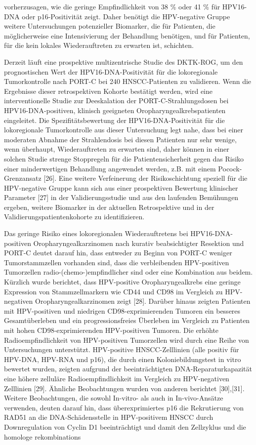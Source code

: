 vorherzusagen, wie die geringe Empfindlichkeit von 38 \% oder 41 \% für HPV16-DNA oder p16-Positivität zeigt. Daher benötigt die HPV-negative Gruppe weitere Untersuchungen potenzieller Biomarker, die für Patienten, die möglicherweise eine Intensivierung der Behandlung benötigen, und für Patienten, für die kein lokales Wiederauftreten zu erwarten ist, schichten.

Derzeit läuft eine prospektive multizentrische Studie des DKTK-ROG, um den prognostischen Wert der HPV16-DNA-Positivität für die lokoregionale Tumorkontrolle nach PORT-C bei 240 HNSCC-Patienten zu validieren. Wenn die Ergebnisse dieser retrospektiven Kohorte bestätigt werden, wird eine interventionelle Studie zur Deeskalation der PORT-C-Strahlungsdosen bei HPV16-DNA-positiven, klinisch geeigneten Oropharyngealkrebspatienten eingeleitet. Die Spezifitätsbewertung der HPV16-DNA-Positivität für die lokoregionale Tumorkontrolle aus dieser Untersuchung legt nahe, dass bei einer moderaten Abnahme der Strahlendosis bei diesen Patienten nur sehr wenige, wenn überhaupt, Wiederauftreten zu erwarten sind, daher können in einer solchen Studie strenge Stoppregeln für die Patientensicherheit gegen das Risiko einer minderwertigen Behandlung angewendet werden, z.B. mit einem Pocock-Grenzansatz {[}26{]}. Eine weitere Verfeinerung der Risikoschichtung speziell für die HPV-negative Gruppe kann sich aus einer prospektiven Bewertung klinischer Parameter {[}27{]} in der Validierungsstudie und aus den laufenden Bemühungen ergeben, weitere Biomarker in der aktuellen Retrospektive und in der Validierungspatientenkohorte zu identifizieren.

Das geringe Risiko eines lokoregionalen Wiederauftretens bei HPV16-DNA-positiven Oropharyngealkarzinomen nach kurativ beabsichtigter Resektion und PORT-C deutet darauf hin, dass entweder zu Beginn von PORT-C weniger Tumorstammzellen vorhanden sind, dass die verbleibenden HPV-positiven Tumorzellen radio-(chemo-)empfindlicher sind oder eine Kombination aus beidem. Kürzlich wurde berichtet, dass HPV-positive Oropharyngealkrebs eine geringe Expression von Stammzellmarkern wie CD44 und CD98 im Vergleich zu HPV-negativen Oropharyngealkarzinomen zeigt {[}28{]}. Darüber hinaus zeigten Patienten mit HPV-positiven und niedrigen CD98-exprimierenden Tumoren ein besseres Gesamtüberleben und ein progressionsfreies Überleben im Vergleich zu Patienten mit hohen CD98-exprimierenden HPV-positiven Tumoren. Die erhöhte Radioempfindlichkeit von HPV-positiven Tumorzellen wird durch eine Reihe von Untersuchungen unterstützt. HPV-positive HNSCC-Zelllinien (alle positiv für HPV-DNA, HPV-RNA und p16), die durch einen Koloniebildungstest in vitro bewertet wurden, zeigten aufgrund der beeinträchtigten DNA-Reparaturkapazität eine höhere zelluläre Radioempfindlichkeit im Vergleich zu HPV-negativen Zelllinien {[}29{]}. Ähnliche Beobachtungen wurden von anderen berichtet {[}30{]},{[}31{]}. Weitere Beobachtungen, die sowohl In-vitro- als auch in In-vivo-Ansätze verwenden, deuten darauf hin, dass überexprimiertes p16 die Rekrutierung von RAD51 an die DNA-Schädensstelle in HPV-positivem HNSCC durch Downregulation von Cyclin D1 beeinträchtigt und damit den Zellzyklus und die homologe rekombinations

